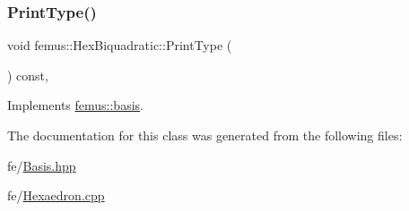 \mbox{\label{classfemus_1_1_hex_biquadratic_a47c356518c173ac4dc43671e5747f7a8}} 
\subsubsection{\texorpdfstring{Print\+Type()}{PrintType()}}
{\footnotesize\ttfamily void femus\+::\+Hex\+Biquadratic\+::\+Print\+Type (\begin{DoxyParamCaption}{ }\end{DoxyParamCaption}) const\hspace{0.3cm}{\ttfamily [inline]}, {\ttfamily [virtual]}}



Implements \mbox{\hyperlink{classfemus_1_1basis_abbae7bf8f31ec5793c911bc6d4ea0572}{femus\+::basis}}.



The documentation for this class was generated from the following files\+:\begin{DoxyCompactItemize}
\item 
fe/\mbox{\hyperlink{_basis_8hpp}{Basis.\+hpp}}\item 
fe/\mbox{\hyperlink{_hexaedron_8cpp}{Hexaedron.\+cpp}}\end{DoxyCompactItemize}
